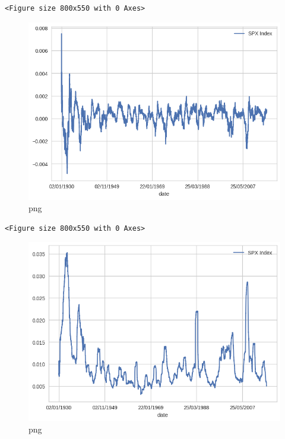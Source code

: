 \begin{lstlisting}
<Figure size 800x550 with 0 Axes>
\end{lstlisting}

\begin{figure}
\centering
\includegraphics{ProcessingStockPriceData_files/ProcessingStockPriceData_8_1.png}
\caption{png}
\end{figure}

\begin{lstlisting}
<Figure size 800x550 with 0 Axes>
\end{lstlisting}

\begin{figure}
\centering
\includegraphics{ProcessingStockPriceData_files/ProcessingStockPriceData_8_3.png}
\caption{png}
\end{figure}

